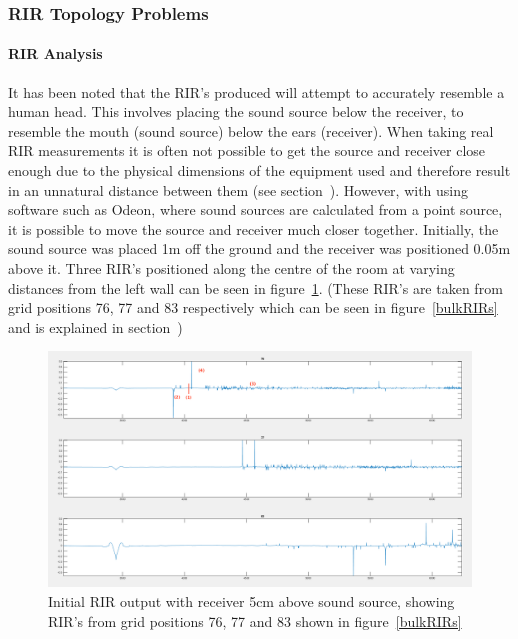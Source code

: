 \documentclass[../../main.tex]{subfiles}
\begin{document}
		\subsubsection{RIR Topology Problems}
		\label{odeonError}

			\paragraph{RIR Analysis}
			It has been noted that the \ac{RIR}'s produced will attempt to accurately resemble a human head. This involves placing the sound source below the receiver, to resemble the mouth (sound source) below the ears (receiver). When taking real \ac{RIR} measurements it is often not possible to get the source and receiver close enough due to the physical dimensions of the equipment used and therefore result in an unnatural distance between them (see section~). However, with using software such as Odeon, where sound sources are calculated from a point source, it is possible to move the source and receiver much closer together. Initially, the sound source was placed 1m off the ground and the receiver was positioned 0.05m above it. Three \ac{RIR}'s positioned along the centre of the room at varying distances from the left wall can be seen in figure~\ref{incorrectRIR}. (These \ac{RIR}'s are taken from grid positions 76, 77 and 83 respectively which can be seen in figure~\ref{bulkRIRs} and is explained in section~)

			


			\begin{figure}
				\centerline{\includegraphics[width=\textwidth]{Sections/Implementation/Odeon/images/incorrectRIR/RIR_76_incorrect_edit.png}}
				\caption{Initial \ac{RIR} output with receiver 5cm above sound source, showing \ac{RIR}'s from grid positions 76, 77 and 83 shown in figure~\ref{bulkRIRs}}
				\label{incorrectRIR}
			\end{figure}
\end{document}
